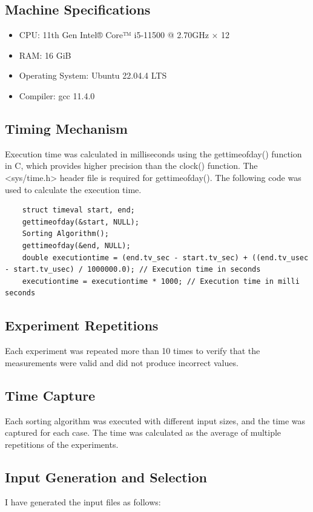 \documentclass[a4paper,12pt]{report}
\begin{document}
\newpage
\subsection{Machine Specifications}
\begin{itemize}
  \item CPU: 11th Gen Intel® Core™ i5-11500 @ 2.70GHz × 12
  \item RAM: 16 GiB
  \item Operating System: Ubuntu 22.04.4 LTS
  \item Compiler: gcc 11.4.0
\end{itemize}

\subsection{Timing Mechanism}
Execution time was calculated in milliseconds using the gettimeofday() function in C, which provides higher precision than the clock() function. The <sys/time.h> header file is required for gettimeofday(). The following code was used to calculate the execution time.
\begin{lstlisting}
    struct timeval start, end;
    gettimeofday(&start, NULL);
    Sorting Algorithm();
    gettimeofday(&end, NULL);
    double executiontime = (end.tv_sec - start.tv_sec) + ((end.tv_usec - start.tv_usec) / 1000000.0); // Execution time in seconds
    executiontime = executiontime * 1000; // Execution time in milli seconds
\end{lstlisting}

\subsection{Experiment Repetitions}
Each experiment was repeated more than 10 times to verify that the measurements were valid and did not produce incorrect values.

\subsection{Time Capture}
Each sorting algorithm was executed with different input sizes, and the time was captured for each case. The time was calculated as the average of multiple repetitions of the experiments. 

\subsection{Input Generation and Selection}
I have generated the input files as follows:
\end{document}
